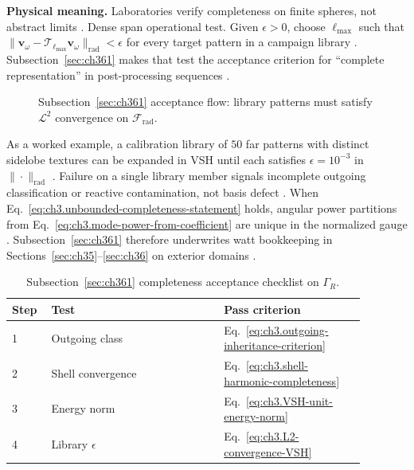 \textbf{Physical meaning.} Laboratories verify completeness on finite spheres, not abstract limits .
Dense span operational test. Given \(\epsilon>0\), choose \(\ell_{\max}\) such that \(\|\mathbf{v}_\omega-\mathcal{T}_{\ell_{\max}}\mathbf{v}_\omega\|_{\mathrm{rad}}<\epsilon\)
for every target pattern in a campaign library . Subsection~\ref{sec:ch361} makes that test the
acceptance criterion for ``complete representation'' in post-processing sequences .
\begin{figure}[t]
\centering
{}
\caption{Subsection~\ref{sec:ch361} acceptance flow: library patterns must satisfy \(\mathcal{L}^{2}\) convergence on
\(\mathcal{F}_{\mathrm{rad}}\).}
\label{fig:ch3.361-acceptance-flow}
\end{figure}
As a worked example, a calibration library of \(50\) far patterns with distinct sidelobe textures can be expanded in VSH until each satisfies
\(\epsilon=10^{-3}\) in \(\|\cdot\|_{\mathrm{rad}}\) . Failure on a single library member
signals incomplete outgoing classification or reactive contamination, not basis defect .
When Eq.~\eqref{eq:ch3.unbounded-completeness-statement} holds, angular power partitions from
Eq.~\eqref{eq:ch3.mode-power-from-coefficient} are unique in the normalized gauge .
Subsection~\ref{sec:ch361} therefore underwrites watt bookkeeping in Sections~\ref{sec:ch35}--\ref{sec:ch36} on exterior
domains .
\begin{table}[t]
\centering
\caption{Subsection~\ref{sec:ch361} completeness acceptance checklist on \(\Gamma_R\).}
\label{tab:ch3.361-acceptance-checklist}
\small
\begin{tabular}{@{}p{0.08\linewidth}p{0.44\linewidth}p{0.36\linewidth}@{}}
\toprule
Step & Test & Pass criterion \\
\midrule
1 & Outgoing class & Eq.~\eqref{eq:ch3.outgoing-inheritance-criterion} \\
2 & Shell convergence & Eq.~\eqref{eq:ch3.shell-harmonic-completeness} \\
3 & Energy norm & Eq.~\eqref{eq:ch3.VSH-unit-energy-norm} \\
4 & Library \(\epsilon\) & Eq.~\eqref{eq:ch3.L2-convergence-VSH} \\
\bottomrule
\end{tabular}
\end{table}
